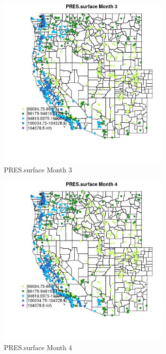 \begin{figure} 
\centering  
\includegraphics[width=0.77\textwidth]{Code_Outputs/Report_ML_input_PM25_Step4_part_e_de_duplicated_aves_compiled_2019-05-21wNAs_MapObsMo3PRESsurface.jpg} 
\caption{\label{fig:Report_ML_input_PM25_Step4_part_e_de_duplicated_aves_compiled_2019-05-21wNAsMapObsMo3PRESsurface}PRES.surface Month 3} 
\end{figure} 
 

\begin{figure} 
\centering  
\includegraphics[width=0.77\textwidth]{Code_Outputs/Report_ML_input_PM25_Step4_part_e_de_duplicated_aves_compiled_2019-05-21wNAs_MapObsMo4PRESsurface.jpg} 
\caption{\label{fig:Report_ML_input_PM25_Step4_part_e_de_duplicated_aves_compiled_2019-05-21wNAsMapObsMo4PRESsurface}PRES.surface Month 4} 
\end{figure} 
 

